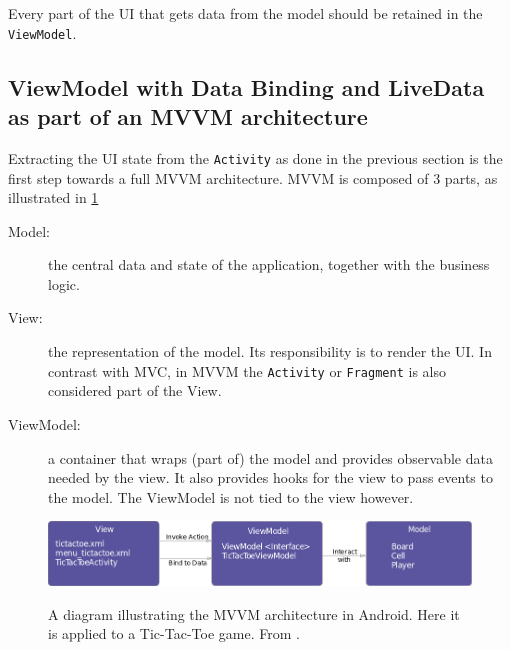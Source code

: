 Every part of the UI that gets data from the model should be retained in the \lstinline!ViewModel!.





\subsection{ViewModel with Data Binding and LiveData as part of an MVVM architecture}

Extracting the UI state from the \lstinline!Activity! as done in the previous section is the first step towards a full MVVM architecture.
MVVM is composed of 3 parts, as illustrated in \ref{fig:MVVMdiagram}
\begin{description}
	\item[Model:] the central data and state of the application, together with the business logic.
	\item[View:] the representation of the model. Its responsibility is to render the UI.
				In contrast with MVC, in MVVM the  \lstinline!Activity! or  \lstinline!Fragment! is also considered part of the View.
	\item[ViewModel:] a container that wraps (part of) the model and provides observable data needed by the view.
	It also provides hooks for the view to pass events to the model. The ViewModel is not tied to the view however.
\end{description}

\begin{figure}[ht]
	\centering
	\includegraphics[width=\textwidth]{images/mvvm/MVVM.png}
	\label{fig:MVVMdiagram}
	\caption{A diagram illustrating the MVVM architecture in Android.
		Here it is applied to a Tic-Tac-Toe game.
		From \cite{mvc-mvp-mvv-on-android}.}
\end{figure}

